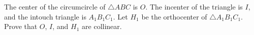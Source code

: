 The center of the circumcircle of $\triangle ABC$ is $O$. The incenter of the triangle is $I$, and the intouch triangle is $A_1B_1C_1$. Let $H_1$ be the orthocenter of $\triangle A_1B_1C_1$. Prove that $O$, $I$, and $H_1$ are collinear.